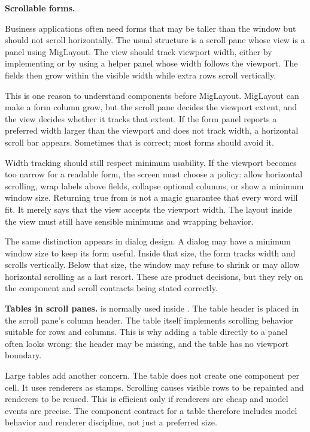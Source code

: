 \textbf{Scrollable forms.}

Business applications often need forms that may be taller than the window but should not scroll horizontally. The usual structure is a scroll pane whose view is a panel using MigLayout. The view should track viewport width, either by implementing  or by using a helper panel whose width follows the viewport. The fields then grow within the visible width while extra rows scroll vertically.

This is one reason to understand components before MigLayout. MigLayout can make a form column grow, but the scroll pane decides the viewport extent, and the view decides whether it tracks that extent. If the form panel reports a preferred width larger than the viewport and does not track width, a horizontal scroll bar appears. Sometimes that is correct; most forms should avoid it.

Width tracking should still respect minimum usability. If the viewport becomes
too narrow for a readable form, the screen must choose a policy: allow
horizontal scrolling, wrap labels above fields, collapse optional columns, or
show a minimum window size. Returning true from
 is not a magic guarantee that every word
will fit. It merely says that the view accepts the viewport width. The layout
inside the view must still have sensible minimums and wrapping behavior.

The same distinction appears in dialog design. A dialog may have a minimum
window size to keep its form useful. Inside that size, the form tracks width and
scrolls vertically. Below that size, the window may refuse to shrink or may
allow horizontal scrolling as a last resort. These are product decisions, but
they rely on the component and scroll contracts being stated correctly.

\textbf{Tables in scroll panes.}  is normally used inside . The table header is placed in the scroll pane's column header. The table itself implements scrolling behavior suitable for rows and columns. This is why adding a table directly to a panel often looks wrong: the header may be missing, and the table has no viewport boundary.

Large tables add another concern. The table does not create one component per cell. It uses renderers as stamps. Scrolling causes visible rows to be repainted and renderers to be reused. This is efficient only if renderers are cheap and model events are precise. The component contract for a table therefore includes model behavior and renderer discipline, not just a preferred size.

